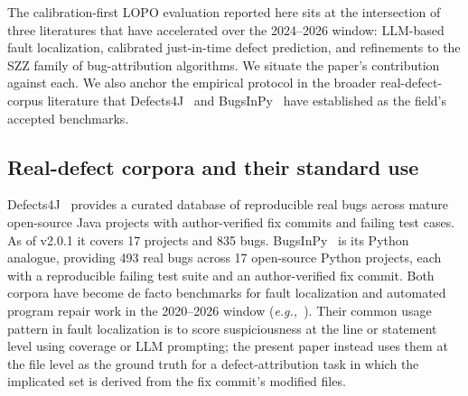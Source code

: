 \documentclass[preprint,12pt]{elsarticle}
\begin{document}
The calibration-first LOPO evaluation reported here sits at the intersection of three literatures that have accelerated over the 2024--2026 window: LLM-based fault localization, calibrated just-in-time defect prediction, and refinements to the SZZ family of bug-attribution algorithms. We situate the paper's contribution against each. We also anchor the empirical protocol in the broader real-defect-corpus literature that Defects4J~\cite{just2014defects4j} and BugsInPy~\cite{widyasari2020bugsinpy} have established as the field's accepted benchmarks.

\subsection{Real-defect corpora and their standard use}

Defects4J~\cite{just2014defects4j} provides a curated database of reproducible real bugs across mature open-source Java projects with author-verified fix commits and failing test cases. As of v2.0.1 it covers 17 projects and 835 bugs. BugsInPy~\cite{widyasari2020bugsinpy} is its Python analogue, providing 493 real bugs across 17 open-source Python projects, each with a reproducible failing test suite and an author-verified fix commit. Both corpora have become de facto benchmarks for fault localization and automated program repair work in the 2020--2026 window (\emph{e.g.,}~\cite{yang2024llmao,kang2024llmfl,rezaalipour2024pyfl}). Their common usage pattern in fault localization is to score suspiciousness at the line or statement level using coverage or LLM prompting; the present paper instead uses them at the file level as the ground truth for a defect-attribution task in which the implicated set is derived from the fix commit's modified files.
\end{document}
